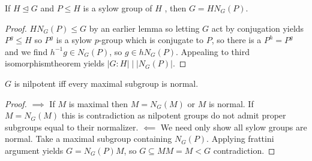 \begin{theorem}
	If \(H \trianglelefteq G\) 	and \(P \le H\) is a sylow group of \(H\) , then \(G = HN_{G}\left( P \right) \).
\end{theorem}
\begin{proof}
	\(HN_{G}\left( P \right)  \le G\) by an earlier lemma so letting \(G\) act by conjugation yields \(P^{g} \le H\) so \(P^{g}\)  is a sylow \(p\)-group which is conjugate to \(P\), so there is a \(P^{h} = P^{g}\) and we find \(h^{-1}g \in N_{G}\left( P \right) \), so \(g \in hN_{G}\left( P \right) \). Appealing to third isomorphismtheorem yields \(\left| G:H \right|  \mid \left| N_{G}\left( P \right)  \right| \).
\end{proof}
\begin{theorem}
	\(G\) is nilpotent iff every maximal subgroup is normal.
\end{theorem}
\begin{proof}
	\(\implies\) If \(M\) is maximal  then \( M = N_{G}\left( M \right) \) or \(M\) is normal. If \(M = N_{G}\left( M \right) \) this is contradiction as nilpotent groups do not admit proper subgroups equal to their normalizer.
	\(\impliedby\) We need only show all sylow groups are normal. Take a maximal subgroup containing \(N_{G}\left( P \right) \). Applying frattini argument yields \(G = N_G\left( P \right) M\), so \(G \subseteq MM = M < G\) contradiction.
\end{proof}
